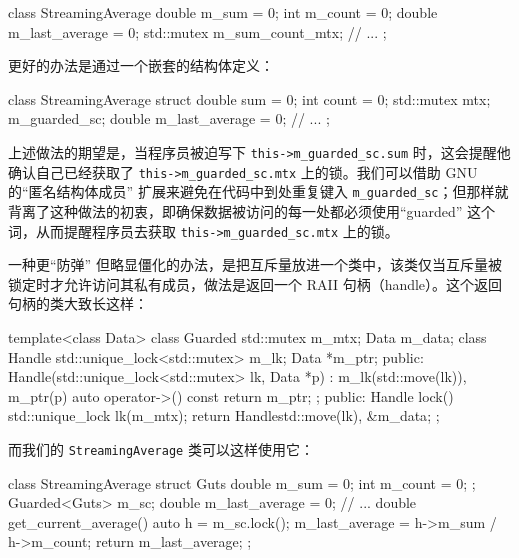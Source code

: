 \begin{codebox}[cpp]
    class StreamingAverage {
      double m_sum = 0;
      int m_count = 0;
      double m_last_average = 0;
      std::mutex m_sum_count_mtx;
      // ...
    };
\end{codebox}

更好的办法是通过一个嵌套的结构体定义：

\begin{codebox}[cpp]
    class StreamingAverage {
      struct {
        double sum = 0;
        int count = 0;
        std::mutex mtx;
      } m_guarded_sc;
      double m_last_average = 0;
      // ...
    };
\end{codebox}

上述做法的期望是，当程序员被迫写下 \texttt{this->m\_\allowbreak{}guarded\_\allowbreak{}sc.\allowbreak{}sum} 时，这会提醒他确认自己已经获取了 \texttt{this->m\_\allowbreak{}guarded\_\allowbreak{}sc.\allowbreak{}mtx} 上的锁。我们可以借助 GNU 的“匿名结构体成员” 扩展来避免在代码中到处重复键入 \texttt{m\_\allowbreak{}guarded\_\allowbreak{}sc}；但那样就背离了这种做法的初衷，即确保数据被访问的每一处都必须使用“guarded” 这个词，从而提醒程序员去获取 \texttt{this->m\_\allowbreak{}guarded\_\allowbreak{}sc.\allowbreak{}mtx} 上的锁。

一种更“防弹” 但略显僵化的办法，是把互斥量放进一个类中，该类仅当互斥量被锁定时才允许访问其私有成员，做法是返回一个 RAII 句柄（handle）。这个返回句柄的类大致长这样：

\begin{codebox}[cpp]
    template<class Data>
    class Guarded {
      std::mutex m_mtx;
      Data m_data;
      class Handle {
        std::unique_lock<std::mutex> m_lk;
        Data *m_ptr;
      public:
        Handle(std::unique_lock<std::mutex> lk, Data *p) :
          m_lk(std::move(lk)), m_ptr(p) {}
        auto operator->() const { return m_ptr; }
      };
    public:
      Handle lock() {
        std::unique_lock lk(m_mtx);
        return Handle{std::move(lk), &m_data};
      }
    };
\end{codebox}

而我们的 \texttt{Streaming\allowbreak{}Average} 类可以这样使用它：

\begin{codebox}[cpp]
    class StreamingAverage {
      struct Guts {
        double m_sum = 0;
        int m_count = 0;
      };
      Guarded<Guts> m_sc;
      double m_last_average = 0;
      // ...
      double get_current_average() {
        auto h = m_sc.lock();
        m_last_average = h->m_sum / h->m_count;
        return m_last_average;
      }
    };
\end{codebox}

